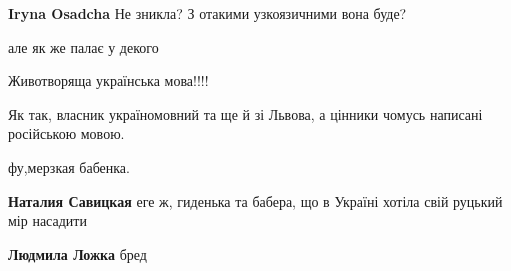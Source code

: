 \begin{itemize}
\begin{itemize}
\textbf{Iryna Osadcha} Не зникла? З отакими узкоязичними вона буде?

\end{itemize}

 
але як же палає у декого \Smiley[1.0][yellow]

 
Животворяща українська мова!!!!

 
Як так, власник україномовний та ще й зі Львова, а цінники чомусь написані російською мовою.

 
фу,мерзкая бабенка.

\begin{itemize}
 
\textbf{Наталия Савицкая} еге ж, гиденька та бабера, що в Україні хотіла свій руцький мір насадити

 
\textbf{Людмила Ложка} бред


\end{itemize}
\end{itemize}
